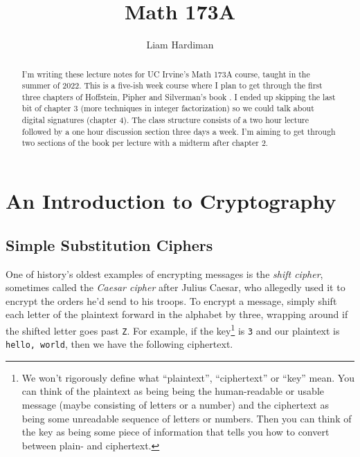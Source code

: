 \documentclass[12pt]{article}
\theoremstyle{plain}
\theoremstyle{definition}
\theoremstyle{remark}
\begin{document}
 
 
\title{Math 173A}
\author{Liam Hardiman}

\maketitle

\begin{abstract}
    I'm writing these lecture notes for UC Irvine's Math 173A course, taught in the summer of 2022.
    This is a five-ish week course where I plan to get through the first three chapters of Hoffstein, Pipher and Silverman's book \cite{HPS}.
    I ended up skipping the last bit of chapter 3 (more techniques in integer factorization) so we could talk about digital signatures (chapter 4).
    The class structure consists of a two hour lecture followed by a one hour discussion section three days a week.
    I'm aiming to get through two sections of the book per lecture with a midterm after chapter 2.

\end{abstract}


\tableofcontents


\section{An Introduction to Cryptography}
\subsection{Simple Substitution Ciphers}
One of history's oldest examples of encrypting messages is the \emph{shift cipher}, sometimes called the \emph{Caesar cipher} after Julius Caesar, who allegedly used it to encrypt the orders he'd send to his troops.
To encrypt a message, simply shift each letter of the plaintext forward in the alphabet by three, wrapping around if the shifted letter goes past \texttt{Z}. For example, if the key\footnote{We won't rigorously define what ``plaintext'', ``ciphertext'' or ``key'' mean. You can think of the plaintext as being being the human-readable or usable message (maybe consisting of letters or a number) and the ciphertext as being some unreadable sequence of letters or numbers. Then you can think of the key as being some piece of information that tells you how to convert between plain- and ciphertext.} is \texttt{3} and our plaintext is \texttt{hello, world}, then we have the following ciphertext.
\end{document}
